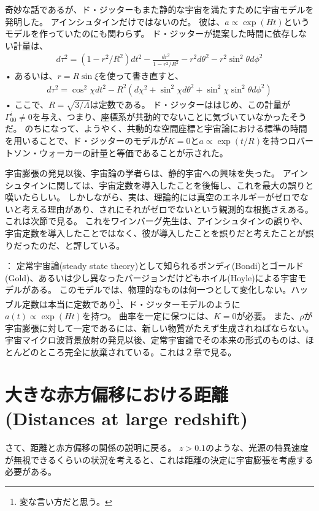 \documentclass[11pt,a4paper,dvipdfmx]{jsarticle}
\theoremstyle{plain}
\theoremstyle{break}
\begin{document}
奇妙な話であるが、ド・ジッターもまた静的な宇宙を満たすために宇宙モデルを発明した。
アインシュタインだけではないのだ。
彼は、$a \propto \exp(Ht)$というモデルを作っていたのにも関わらず。
ド・ジッターが提案した時間に依存しない計量は、
\begin{align}
  d \tau^{2}=\left(1-r^{2} / R^{2}\right) d t^{2}-\frac{d r^{2}}{1-r^{2} / R^{2}}-r^{2} d \theta^{2}-r^{2} \sin ^{2} \theta d \phi^{2}
\end{align}•%
あるいは、$r = R \sin \xi$を使って書き直すと、
\begin{align}
  d \tau^{2}=\cos ^{2} \chi d t^{2}-R^{2}\left(d \chi^{2}+\sin ^{2} \chi d \theta^{2}+\sin ^{2} \chi \sin ^{2} \theta d \phi^{2}\right)
\end{align}•%
ここで、$R = \sqrt{3/\Lambda}$は定数である。
ド・ジッターははじめ、この計量が$\Gamma_{00}^{i} \neq 0$を与え、つまり、座標系が共動的でないことに気づいていなかったそうだ。
のちになって、ようやく、共動的な空間座標と宇宙論における標準の時間を用いることで、ド・ジッターのモデルが$K=0$と$a \propto \exp(t/R)$を持つロバートソン・ウォーカーの計量と等価であることが示された。

宇宙膨張の発見以後、宇宙論の学者らは、静的宇宙への興味を失った。
アインシュタインに関しては、宇宙定数を導入したことを後悔し、これを最大の誤りと嘆いたらしい。
しかしながら、実は、理論的には真空のエネルギーがゼロでないと考える理由があり、されにそれがゼロでないという観測的な根拠さえある。
これは次節で見る。
これをワインバーグ先生は、アインシュタインの誤りや、宇宙定数を導入したことではなく、彼が導入したことを誤りだと考えたことが誤りだったのだ、と評している。

\vspace{0.8pt}
\noindent
{}：
定常宇宙論(steady state theory)として知られるボンディ(Bondi)とゴールド(Gold)、あるいは少し異なったバージョンだけどもホイル(Hoyle)による宇宙モデルがある。
このモデルでは、物理的なものは何一つとして変化しない。ハッブル定数は本当に定数であり\footnote{変な言い方だと思う。}、ド・ジッターモデルのように$a(t) \propto \exp(Ht)$を持つ。
曲率を一定に保つには、$K=0$が必要。
また、$\rho$が宇宙膨張に対して一定であるには、新しい物質がたえず生成されねばならない。
宇宙マイクロ波背景放射の発見以後、定常宇宙論でその本来の形式のものは、ほとんどのところ完全に放棄されている。これは２章で見る。

\section{大きな赤方偏移における距離(Distances at large redshift)}\label{sec:Distances-at-large-redshift}
さて、距離と赤方偏移の関係の説明に戻る。
$z>0.1$のような、光源の特異速度が無視できるくらいの状況を考えると、これは距離の決定に宇宙膨張を考慮する必要がある。
\end{document}
